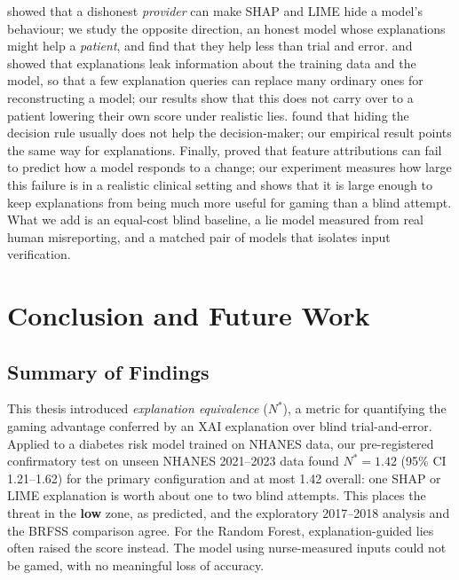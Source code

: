 \documentclass[12pt, a4paper, oneside]{report}
\theoremstyle{definition}
\begin{document}
\citet{slack2020fooling} showed that a dishonest \emph{provider} can make
SHAP and LIME hide a model's behaviour; we study the opposite direction,
an honest model whose explanations might help a \emph{patient}, and find
that they help less than trial and error. \citet{shokri2021privacy} and
\citet{milli2019model} showed that explanations leak information about
the training data and the model, so that a few explanation queries can
replace many ordinary ones for reconstructing a model; our results show
that this does not carry over to a patient lowering their own score
under realistic lies. \citet{ghalme2021strategic} found that hiding the
decision rule usually does not help the decision-maker; our empirical
result points the same way for explanations. Finally,
\citet{bilodeau2024impossibility} proved that feature attributions can
fail to predict how a model responds to a change; our experiment
measures how large this failure is in a realistic clinical setting and
shows that it is large enough to keep explanations from being much
more useful for gaming than a blind attempt. What we add is an equal-cost blind baseline, a lie model
measured from real human misreporting, and a matched pair of models
that isolates input verification.

\chapter{Conclusion and Future Work}
\label{chap:conclusion}

\section{Summary of Findings}

This thesis introduced \textit{explanation equivalence} ($N^*$), a metric
for quantifying the gaming advantage conferred by an XAI explanation over
blind trial-and-error. Applied to a diabetes risk model trained on NHANES
data, our pre-registered confirmatory test on unseen NHANES 2021--2023
data found $N^* = 1.42$ (95\% CI 1.21--1.62) for the primary
configuration and at most 1.42 overall: one SHAP or LIME explanation is
worth about one to two blind attempts. This places the threat in the
\textbf{low} zone, as predicted, and the exploratory 2017--2018 analysis
and the BRFSS comparison agree. For the Random Forest, explanation-guided
lies often raised the score instead. The model using nurse-measured
inputs could not be gamed, with no meaningful loss of accuracy.
\end{document}
